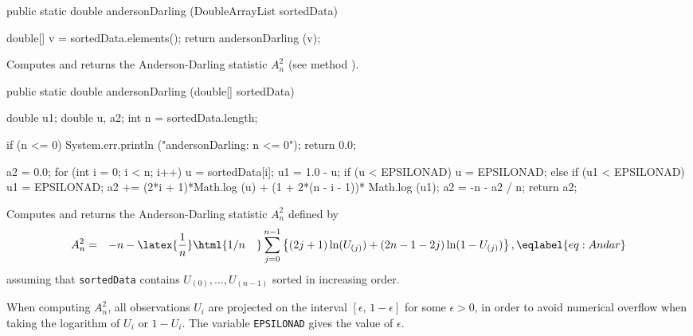\begin{code}

   public static double andersonDarling (DoubleArrayList sortedData)\begin{hide} {
      double[] v = sortedData.elements();
      return andersonDarling (v);
   }\end{hide}
\end{code}
\begin{tabb} Computes and returns the Anderson-Darling statistic $A_n^2$
(see method ).
 \end{tabb}
\begin{htmlonly}
\end{htmlonly}
\begin{code}

   public static double andersonDarling (double[] sortedData)\begin{hide} {
      double u1;
      double u, a2;
      int n = sortedData.length;

      if (n <= 0) {
         System.err.println ("andersonDarling: n <= 0");
         return 0.0;
      }

      a2 = 0.0;
      for (int i = 0; i < n; i++) {
         u = sortedData[i];
         u1 = 1.0 - u;
         if (u < EPSILONAD)
            u = EPSILONAD;
         else if (u1 < EPSILONAD)
            u1 = EPSILONAD;
         a2 += (2*i + 1)*Math.log (u) + (1 + 2*(n - i - 1))*
                    Math.log (u1);
      }
      a2 = -n - a2 / n;
      return a2;
   }\end{hide}
\end{code}
\begin{tabb} Computes and returns the Anderson-Darling statistic $A_n^2$
     defined by
  \begin {eqnarray*}
    A_n^2 &=& -n -\latex{\frac{1}{ n}}\html{1/n\quad} \sum_{j=0}^{n-1}
          \left\{ (2j+1)\ln (U_{(j)})
               + (2n-1-2j) \ln (1-U_{(j)}) \right\},      \eqlabel {eq:Andar}
  \end {eqnarray*}
  assuming that \texttt{sortedData} contains $U_{(0)},\dots,U_{(n-1)}$
  sorted in increasing order.
 \begin{detailed}
  When computing $A_n^2$,
  all observations $U_i$ are projected on the interval
  $[\epsilon,\,1-\epsilon]$ for some $\epsilon > 0$, in order to
  avoid numerical overflow when taking the logarithm of $U_i$ or
  $1-U_i$.  The variable \texttt{EPSILONAD} gives the value of $\epsilon$.
 \end{detailed}
 \end{tabb}
